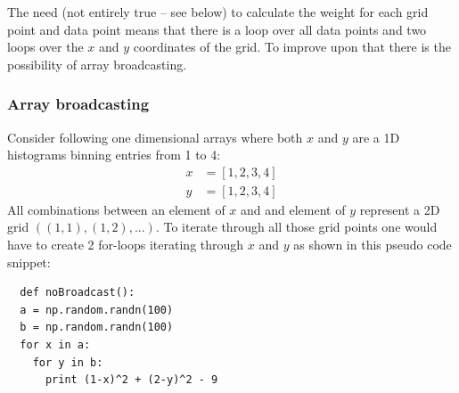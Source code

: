 \documentclass[11pt]{scrreprt}
\begin{document}
The need (not entirely true -- see below) to calculate the weight for each grid point and data point means that there is a loop over all
data points and two loops over the $x$ and $y$ coordinates of the grid. To improve upon that there is the possibility of array broadcasting.

\newpage
\subsubsection{Array broadcasting}
Consider following one dimensional arrays where both $x$ and $y$ are a 1D histograms binning entries from 1 to 4: 
\begin{align*}
  x &= [1, 2, 3, 4]\\
  y &= [1, 2, 3, 4]  
\end{align*}
All combinations between an element of $x$ and and element of $y$ represent a 2D grid $\left((1,1), (1,2), ...\right)$. To iterate through 
all those grid points one would have to create 2 for-loops iterating through $x$ and $y$ as shown in this pseudo code snippet: %
    \begin{lstlisting}
  def noBroadcast():
  a = np.random.randn(100)
  b = np.random.randn(100) 
  for x in a:
    for y in b:
      print (1-x)^2 + (2-y)^2 - 9
\end{lstlisting} 
\end{document}
